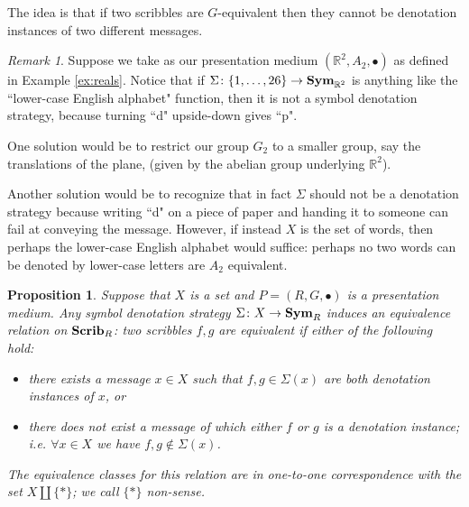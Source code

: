 \documentclass{amsart}
\def\to{\rightarrow}
\def\RR{{\mathbb R}}
\def\taking{\colon}
\def\Scrib{{\bf Scrib}}
\def\Sym{{\bf Sym}}
\newtheorem{proposition}[theorem]{Proposition}
\theoremstyle{remark}
\newtheorem{remark}[theorem]{Remark}
\theoremstyle{definition}
\begin{document}
The idea is that if two scribbles are $G$-equivalent then they cannot be denotation instances of two different messages.

\begin{remark}

Suppose we take as our presentation medium $(\RR^2,A_2,\bullet)$ as defined in Example \ref{ex:reals}. Notice that if $\Sigma\taking\{1,\ldots,26\}\to\Sym_{\RR^2}$ is anything like the ``lower-case English alphabet" function, then it is not a symbol denotation strategy, because turning ``d" upside-down gives ``p". 

One solution would be to restrict our group $G_2$ to a smaller group, say the translations of the plane, (given by the abelian group underlying $\RR^2$). 

Another solution would be to recognize that in fact $\Sigma$ should not be a denotation strategy because writing ``d" on a piece of paper and handing it to someone can fail at conveying the message. However, if instead $X$ is the set of words, then perhaps the lower-case English alphabet would suffice: perhaps no two words can be denoted by lower-case letters are $A_2$ equivalent.

\end{remark}

\begin{proposition}

Suppose that $X$ is a set and $P=(R,G,\bullet)$ is a presentation medium. Any symbol denotation strategy  $\Sigma\taking X\to\Sym_R$ induces an equivalence relation on $\Scrib_R$: two scribbles $f,g$ are equivalent if either of the following hold:\begin{itemize}\item there exists a message $x\in X$ such that $f,g\in\Sigma(x)$ are both denotation instances of $x$, or \item there does not exist a message of which either $f$ or $g$ is a denotation instance; i.e. $\forall x\in X$ we have $f,g\not\in\Sigma(x)$.\end{itemize} The equivalence classes for this relation are in one-to-one correspondence with the set $X\amalg\{*\}$; we call $\{*\}$ {\em non-sense}.

\end{proposition}
\end{document}
